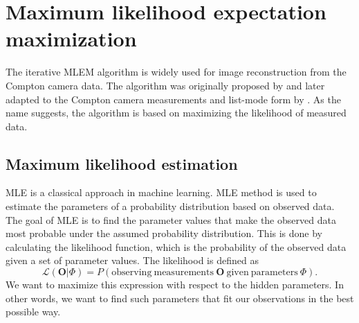 
\section{Maximum likelihood expectation maximization}
The iterative \ac{MLEM} algorithm is widely used for image reconstruction from the Compton camera data. %
The algorithm was originally proposed by \cite{MLEM_Shepp_1982} and later adapted to the Compton camera measurements and list-mode form by \cite{wilderman}.
As the name suggests, the algorithm is based on maximizing the likelihood of measured data.

\subsection{Maximum likelihood estimation}
\ac{MLE} is a classical approach in machine learning.
\ac{MLE} method is used to estimate the parameters of a probability distribution based on observed data. 
The goal of \ac{MLE} is to find the parameter values that make the observed data most probable under the assumed probability distribution.
This is done by calculating the likelihood function, which is the probability of the observed data given a set of parameter values.
The likelihood is defined as 
\begin{equation}
  \mathcal{L}(\boldsymbol{O}| \Phi) = P( \mathrm{observing\ measurements} \  \boldsymbol{O} \ \mathrm{given\ parameters\ } \Phi ).
  \label{eq:likelihood}
\end{equation}
We want to maximize this expression with respect to the hidden parameters.
In other words, we want to find such parameters that fit our observations in the best possible way.

